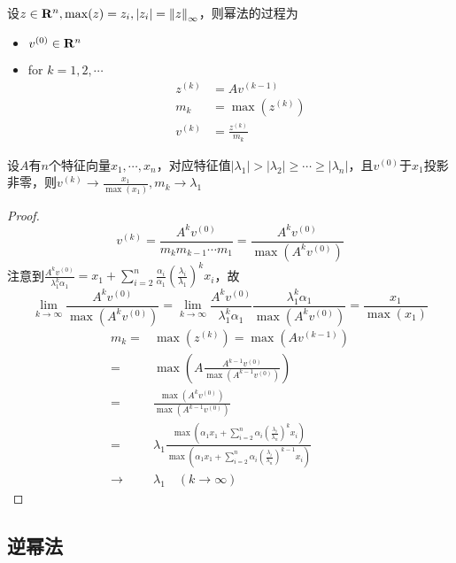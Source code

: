 \documentclass{ctexart}
\begin{document}
设$z\in\mathbf{R}^n,\max(z)=z_i,|z_i|=\left\|z \right\|_\infty$，则幂法的过程为
\begin{itemize}
\item $v^{(0)}\in\mathbf{R}^n$
\item for $k=1,2,\cdots$
\begin{align*}
z^{(k)}&=Av^{(k-1)}\\
m_k&=\max(z^{(k)})\\
v^{(k)}&=\frac{z^{(k)}}{m_k}
\end{align*}
\end{itemize}

\begin{Thm}
设$A$有$n$个特征向量$x_1,\cdots,x_n$，对应特征值$|\lambda_1|>|\lambda_2|\geq\cdots\geq |\lambda_n|$，且$v^{(0)}$于$x_1$投影非零，则$v^{(k)}\to \frac{x_1}{\max(x_1)},m_k\to \lambda_1$
\end{Thm}
\begin{proof}
\[v^{(k)}=\frac{A^kv^{(0)}}{m_km_{k-1}\cdots m_1}=\frac{A^kv^{(0)}}{\max(A^kv^{(0)})}\]
注意到$\frac{A^kv^{(0)}}{\lambda_1^k\alpha_1}=x_1+\sum\limits_{i=2}^n\frac{\alpha_i}{\alpha_1}(\frac{\lambda_i}{\lambda_1})^kx_i$，故
\[\lim\limits_{k\to\infty}\frac{A^kv^{(0)}}{\max(A^kv^{(0)})}=\lim\limits_{k\to\infty}\frac{A^kv^{(0)}}{\lambda_1^k\alpha_1}\frac{\lambda_1^k\alpha_1}{\max(A^kv^{(0)})}=\frac{x_1}{\max(x_1)}\]
\begin{align*}
m_k=&\max(z^{(k)})=\max(Av^{(k-1)})\\
=&\max(A\frac{A^{k-1}v^{(0)}}{\max(A^{k-1}v^{(0)})})\\
=&\frac{\max(A^{k}v^{(0)})}{\max(A^{k-1}v^{(0)})}\\
=&\lambda_1\frac{\max(\alpha_1x_1+\sum\limits_{i=2}^n\alpha_i(\frac{\lambda_i}{\lambda_n})^kx_i)}{\max(\alpha_1x_1+\sum\limits_{i=2}^n\alpha_i(\frac{\lambda_i}{\lambda_n})^{k-1}x_i)}\\
\to&\lambda_1\quad (k\to\infty)
\end{align*}
\end{proof}

\subsection{逆幂法}
\end{document}
